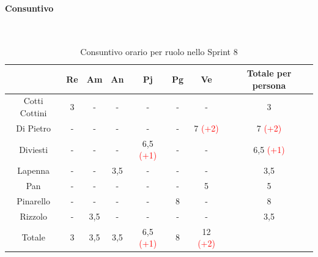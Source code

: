 \documentclass{article}
\begin{document}
            
                \paragraph{Consuntivo}\mbox{}\\
                \begin{table}[H]
                    \centering
                    \begin{tabular}{|c|c|c|c|c|c|c|c|}
                    \hline
                                    & Re  & Am  & An  & Pj  & Pg  & Ve  & Totale per persona \\ \hline
                    Cotti Cottini & 3   & -   & -   & -   & -   & -   & 3                  \\ \hline
                    Di Pietro     & -   & -   & -   & -   & -   & 7 \textcolor{red}{(+2)}   & 7 \textcolor{red}{(+2)}                  \\ \hline
                    Diviesti      & -   & -   & -   & 6,5 \textcolor{red}{(+1)} & -   & -   & 6,5 \textcolor{red}{(+1)}                \\ \hline
                    Lapenna       & -   & -   & 3,5 & -   & -   & -   & 3,5                \\ \hline
                    Pan           & -   & -   & -   & -   & -   & 5   & 5                  \\ \hline
                    Pinarello     & -   & -   & -   & -   & 8  & -   & 8                 \\ \hline
                    Rizzolo       & -   & 3,5 & -   & -   & -   & -   & 3,5                \\ \hline
                    Totale        & 3   & 3,5 & 3,5 & 6,5 \textcolor{red}{(+1)} & 8  & 12 \textcolor{red}{(+2)}  &                    \\ \hline
                    \end{tabular}
                    \caption{Consuntivo orario per ruolo nello Sprint 8}
                \end{table}

\end{document}
